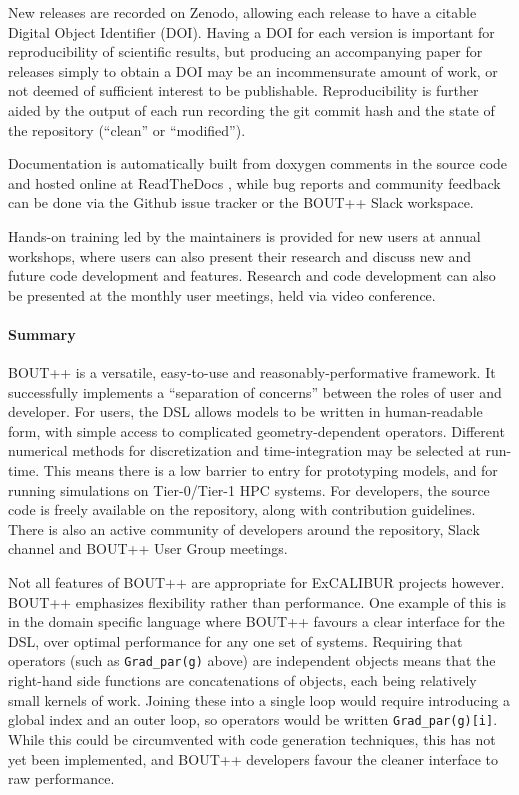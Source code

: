 New releases are recorded on Zenodo, allowing each release to have a citable Digital Object Identifier (DOI).
Having a DOI for each version is important for reproducibility of scientific results, but producing an accompanying paper for releases simply to obtain a DOI may be an incommensurate amount of work, or not deemed of sufficient interest to be publishable.
Reproducibility is further aided by the output of each run recording the git commit hash and the state of the repository (``clean'' or ``modified'').

Documentation is automatically built from doxygen comments in the source code and hosted online at ReadTheDocs \cite{boutreadthedocs}, while bug reports and community feedback can be done via the Github issue tracker or the BOUT++ Slack workspace.

Hands-on training led by the maintainers is provided for new users at annual workshops, where users can also present their research and discuss new and future code development and features. Research and code development can also be presented at the monthly user meetings, held via video conference.

\paragraph{Summary}

BOUT++ is a versatile, easy-to-use and reasonably-performative framework.
It successfully implements a ``separation of concerns'' between the roles of user and developer.
For users, the DSL allows models to be written in human-readable form, with simple access to complicated geometry-dependent operators.
Different numerical methods for discretization and time-integration may be selected at run-time.
This means there is a low barrier to entry for prototyping models, and for running simulations on Tier-0/Tier-1 HPC systems.
For developers, the source code is freely available on the repository, along with contribution guidelines.
There is also an active community of developers around the repository, Slack channel and BOUT++ User Group meetings.

Not all features of BOUT++ are appropriate for ExCALIBUR projects however.
BOUT++ emphasizes flexibility rather than performance. 
One example of this is in the domain specific language where BOUT++ favours a clear interface for the DSL, over optimal performance for any one set of systems.
Requiring that operators (such as \texttt{Grad\_par(g)} above) are independent objects means that the right-hand side functions are concatenations of objects, each being relatively small kernels of work. 
Joining these into a single loop would require introducing a global index and an outer loop, so operators would be written \texttt{Grad\_par(g)[i]}.
While this could be circumvented with code generation techniques, this has not yet been implemented, and BOUT++ developers favour the cleaner interface to raw performance.


